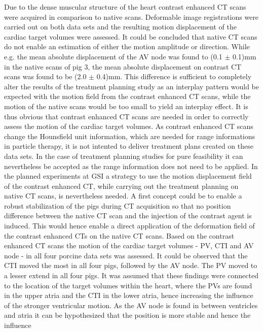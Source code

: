 Due to the dense muscular structure of the heart contrast enhanced CT scans were acquired in comparison to native scans. Deformable image 
registrations were carried out on both data sets and the resulting motion displacement of the cardiac target volumes were assessed. It 
could be concluded that native CT scans do not enable an estimation of either the motion amplitude or direction. While e.g. the mean absolute displacement 
of the AV node was found to (0.1 $\pm$ 0.1)mm in the native scans of pig 3, the mean absolute displacement on contrast CT scans was found to 
be (2.0 $\pm$ 0.4)mm. This difference is sufficient to completely alter the results of the treatment planning study as
an interplay pattern would be expected with the motion field from the contrast enhanced CT scans, while the motion of the native scans would 
be too small to yield an interplay effect. 
It is thus obvious that contrast enhanced CT scans are needed in order to correctly assess the motion of the cardiac target volumes. 
As contrast enhanced CT scans change the Hounsfield unit information, which are needed for range informations in particle therapy, it is 
not intented to deliver treatment plans created on these data sets. In the case of treatment planning studies for pure feasibility  
it can nevertheless be accepted as the range information does not need to be applied. In the planned experiments at GSI a strategy to use 
the motion displacement field of the contrast enhanced CT, while carrying out the treatment planning on native CT scans, is nevertheless needed. 
A first concept could be to enable a robust stabilization of the pigs during CT acquisition so that no position difference between the native 
CT scan and the injection of the contrast agent is induced. This would hence enable a direct application of the 
deformation field of the contrast enhanced CTs on the native CT scans.\newline
\newline
Based on the contrast enhanced CT scans the motion of the cardiac target volumes - PV, CTI and AV node - in all four porcine 
data sets was assessed. It could be observed that the CTI moved the most in all four pigs, followed by the AV node. The PV moved to a lesser 
extend in all four pigs. It was assumed that these findings were connected to the location of the target volumes within the heart, where 
the PVs are found in the upper atria and the CTI in the lower atria, hence increasing the influence of the stronger ventricular motion. 
As the AV node is found in between ventricles and atria it can be hypothesized that the position is more stable and hence the influence 
